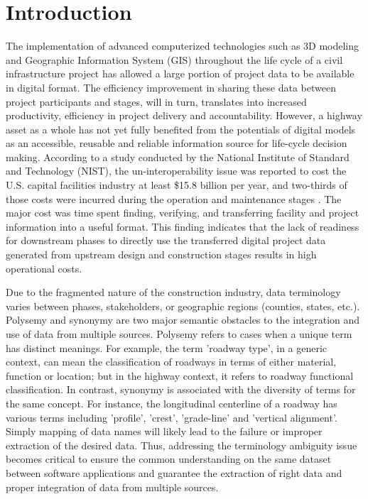 \documentclass[Journal, InsideFigs, DoubleSpace]{ascelike} %
\begin{document}
\section{Introduction}%
%
The implementation of advanced computerized technologies such as 3D modeling and Geographic Information System (GIS) throughout the life cycle of a civil infrastructure project has allowed a large portion of project data to be available in digital format. The efficiency improvement in sharing these data between project participants and stages, will in turn, translates into increased productivity, efficiency in project delivery and accountability. However, a highway asset as a whole has not yet fully benefited from the potentials of digital models as an accessible, reusable and reliable information source for life-cycle decision making. According to a study conducted by the National Institute of Standard and Technology (NIST), the un-interoperability issue was reported to cost the U.S. capital facilities industry at least \$15.8 billion per year, and two-thirds of those costs were incurred during the operation and maintenance stages \cite{Gallaher04}. The major cost was time spent finding, verifying, and transferring facility and project information into a useful format. This finding indicates that the lack of readiness for downstream phases to directly use the transferred digital project data generated from upstream design and construction stages results in high operational costs.
\par
Due to the fragmented nature of the construction industry, data terminology varies between phases, stakeholders, or geographic regions (counties, states, etc.). Polysemy and synonymy are two major semantic obstacles to the integration and use of data from multiple sources. Polysemy refers to cases when a unique term has distinct meanings. For example, the term 'roadway type', in a generic context, can mean the classification of roadways in terms of either material, function or location; but in the highway context, it refers to roadway functional classification. In contrast, synonymy is associated with the diversity of terms for the same concept. For instance, the longitudinal centerline of a roadway has various terms including 'profile', 'crest', 'grade-line' and 'vertical alignment'. Simply mapping of data names will likely lead to the failure or improper extraction of the desired data. Thus, addressing the terminology ambiguity issue becomes critical to ensure the common understanding on the same dataset between software applications and guarantee the extraction of right data and proper integration of data from multiple sources.
\end{document}
